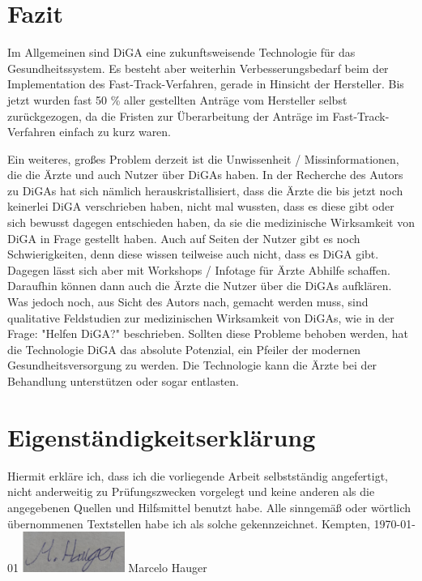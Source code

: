 \documentclass{article}
\begin{document}
	\section{Fazit}
		Im Allgemeinen sind DiGA eine zukunftsweisende Technologie für das Gesundheitssystem. Es besteht aber weiterhin Verbesserungsbedarf beim der Implementation des Fast-Track-Verfahren, gerade in Hinsicht der Hersteller. Bis jetzt wurden fast 50 \% aller gestellten Anträge vom Hersteller selbst zurückgezogen, da die Fristen zur Überarbeitung der Anträge im Fast-Track-Verfahren einfach zu kurz waren.\par 
		Ein weiteres, großes Problem derzeit ist die Unwissenheit / Missinformationen, die die Ärzte und auch Nutzer über DiGAs haben. In der Recherche des Autors zu DiGAs hat sich nämlich herauskristallisiert, dass die Ärzte die bis jetzt noch keinerlei DiGA verschrieben haben, nicht mal wussten, dass es diese gibt oder sich bewusst dagegen entschieden haben, da sie die medizinische Wirksamkeit von DiGA in Frage gestellt haben. Auch auf Seiten der Nutzer gibt es noch Schwierigkeiten, denn diese wissen teilweise auch nicht, dass es DiGA gibt. Dagegen lässt sich aber mit Workshops / Infotage für Ärzte Abhilfe schaffen. Daraufhin können dann auch die Ärzte die Nutzer über die DiGAs aufklären. Was jedoch noch, aus Sicht des Autors nach, gemacht werden muss, sind qualitative Feldstudien zur medizinischen Wirksamkeit von DiGAs, wie in der Frage: "Helfen DiGA?" beschrieben. Sollten diese Probleme behoben werden, hat die Technologie DiGA das absolute Potenzial, ein Pfeiler der modernen Gesundheitsversorgung zu werden. Die Technologie kann die Ärzte bei der Behandlung unterstützen oder sogar entlasten.
		\newpage
	\section{Eigenständigkeitserklärung}
		Hiermit erkläre ich, dass ich die vorliegende Arbeit selbstständig angefertigt, nicht anderweitig zu Prüfungszwecken vorgelegt und keine anderen als die angegebenen Quellen und Hilfsmittel benutzt habe.
		\newline  
		\newline
		Alle sinngemäß oder wörtlich übernommenen Textstellen habe ich als solche gekennzeichnet.
		\newline
		\newline
		\newline
		Kempten, \today 
		\newline
		\newline
		\newline
		\includegraphics[width=0.25\textwidth]{./grafiken/unterschrift} 
		\newline
		Marcelo Hauger 
		\newpage
		

			   	 
\end{document}
